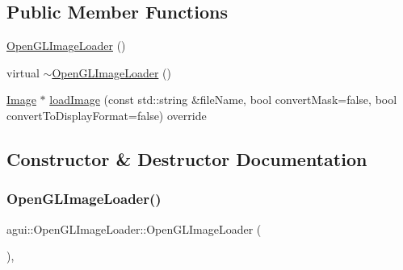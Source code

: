 \subsection*{Public Member Functions}
\begin{DoxyCompactItemize}
\item 
\mbox{\hyperlink{classagui_1_1_open_g_l_image_loader_afef741cd01e9bc4eec31d8716b5c627f}{Open\+G\+L\+Image\+Loader}} ()
\item 
virtual \mbox{\hyperlink{classagui_1_1_open_g_l_image_loader_a55fd0b531c3690c36df8570945027e55}{$\sim$\+Open\+G\+L\+Image\+Loader}} ()
\item 
\mbox{\hyperlink{class_image}{Image}} $\ast$ \mbox{\hyperlink{classagui_1_1_open_g_l_image_loader_a2bba292e2c4aeb6108e8a7806b4d18c0}{load\+Image}} (const std\+::string \&file\+Name, bool convert\+Mask=false, bool convert\+To\+Display\+Format=false) override
\end{DoxyCompactItemize}


\subsection{Constructor \& Destructor Documentation}
\mbox{\label{classagui_1_1_open_g_l_image_loader_afef741cd01e9bc4eec31d8716b5c627f}} 
\subsubsection{\texorpdfstring{Open\+G\+L\+Image\+Loader()}{OpenGLImageLoader()}}
{\footnotesize\ttfamily agui\+::\+Open\+G\+L\+Image\+Loader\+::\+Open\+G\+L\+Image\+Loader (\begin{DoxyParamCaption}{ }\end{DoxyParamCaption})\hspace{0.3cm}{\ttfamily [explicit]}, {\ttfamily [default]}}

\mbox{\label{classagui_1_1_open_g_l_image_loader_a55fd0b531c3690c36df8570945027e55}} 
